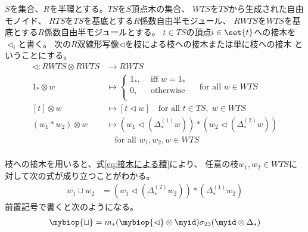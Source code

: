 	\begin{definition}[枝への接木]\label{def:枝への接木} %
		$S$を集合、$R$を半環とする。$TS$を$S$頂点木の集合、
		$WTS$を$TS$から生成された自由モノイド、
		$RTS$を$TS$を基底とする$R$係数自由半モジュール、
		$RWTS$を$WTS$を基底とする$R$係数自由半モジュールとする。
		$t\in TS$の頂点$i\in \set{t}$への接木を$\lhd_i$と書く。
		次の$R$双線形写像$\lhd$を枝による枝への接木または単に枝への接木
		ということにする。
		\begin{equation}\begin{split} %
			\lhd: RWTS\otimes RWTS &\to RWTS \\
			1_*\otimes w &\mapsto \begin{cases} %
				1_*, &\text{ iff }w=1_* \\
				0, &\text{ otherwise } \\
			\end{cases} %
			\quad\text{for all }w\in WTS \\
			[t]\otimes w &\mapsto [t\lhd w] \quad\text{for all }t\in TS,\;w\in WTS \\
			(w_1*w_2)\otimes w &\mapsto \left(w_1\lhd(\Delta_*^{(1)}w)\right) * \left(w_2\lhd(\Delta_*^{(2)}w)\right) \\
			& \quad\text{for all }w_1,w_2,w\in WTS \\
		\end{split}\end{equation} %
	\end{definition} %

	枝への接木を用いると、式\eqref{eq:接木による積}により、
	任意の枝$w_1,w_2\in WTS$に対して次の式が成り立つことがわかる。
	\begin{equation}\begin{split} %
		w_1\sqcup w_2 &= \left(w_1\lhd(\Delta_*^{(2)}w_2)\right)*(\Delta_*^{(1)}w_2)
	\end{split}\end{equation} %
	前置記号で書くと次のようになる。
	\begin{equation}\begin{split} %
		\mybiop{\sqcup} = m_*(\mybiop{\lhd}\otimes\myid)\sigma_{23}(\myid\otimes\Delta_*)
	\end{split}\end{equation} %

